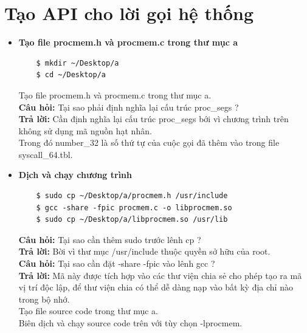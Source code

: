 \documentclass[a4paper,12pt]{article}
\begin{document}
	\section{Tạo API cho lời gọi hệ thống}
	\begin{itemize}
	\item \textbf{Tạo file procmem.h và procmem.c trong thư mục a}
	\begin{verbatim}
	$ mkdir ~/Desktop/a
	$ cd ~/Desktop/a
	\end{verbatim}
	Tạo file  procmem.h và procmem.c trong thư mục a. \\
	\textbf{Câu hỏi: }Tại sao phải định nghĩa lại cấu trúc proc\_segs ? \\
	\textbf{Trả lời:} Cần định nghĩa lại cấu trúc proc\_segs bới vì chương trình trên không sử dụng mã nguồn hạt nhân.\\
	Trong đó number\_32 là số thứ tự của cuộc gọi đã thêm vào trong file syscall\_64.tbl.
	\item \textbf{Dịch và chạy chương trình}
	\begin{verbatim}
	$ sudo cp ~/Desktop/a/procmem.h /usr/include
	$ gcc -share -fpic procmem.c -o libprocmem.so
	$ sudo cp ~/Desktop/a/libprocmem.so /usr/lib
	\end{verbatim}
	\textbf{Câu hỏi: }Tại sao cần thêm sudo trước lênh cp ?	\\
	\textbf{Trả lời: }Bời vì thư mục /usr/include thuộc quyền sở hữu của root. \\
	\textbf{Câu hỏi: }Tại sao cần đặt -share -fpic vào lênh gcc ? \\
	\textbf{Trả lời: }Mã này được tích hợp vào các thư viện chia sẻ cho phép tạo ra mã vị trí độc lập, để thư viện chia có thể dễ dàng nạp vào bất kỳ địa chỉ nào trong bộ nhớ. \\
	Tạo file source code trong thư mục a. \\
	Biên dịch và chạy source code trên với tùy chọn -lprocmem.
	\end{itemize}
\end{document}
